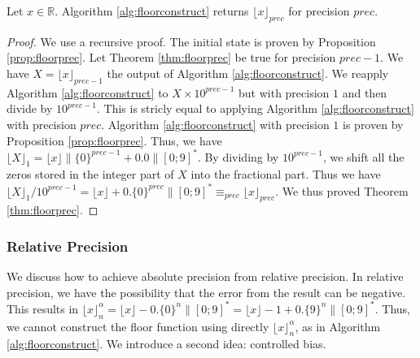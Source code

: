 \documentclass[runningheads]{llncs}
\begin{document}
\begin{theorem}\label{thm:floorprec}
  Let $x\in\mathbb{R}$. Algorithm \ref{alg:floorconstruct} returns $\lfloor x \rfloor_{prec}$ for precision $prec$.
\end{theorem}
\begin{proof}
  We use a recursive proof. The initial state is proven by Proposition \ref{prop:floorprec}. Let Theorem \ref{thm:floorprec} be true for precision $prec-1$. We have $X=\lfloor x \rfloor_{prec-1}$ the output of Algorithm \ref{alg:floorconstruct}. We reapply Algorithm \ref{alg:floorconstruct} to $X\times 10^{prec-1}$ but with precision $1$ and then divide by $10^{prec-1}$. This is stricly equal to applying Algorithm \ref{alg:floorconstruct} with precision $prec$. Algorithm \ref{alg:floorconstruct} with precision $1$ is proven by Proposition \ref{prop:floorprec}. Thus, we have $\lfloor X \rfloor_1 = \lfloor x\rfloor \| \{0\}^{prec-1} + 0.0\|[0;9]^*$. By dividing by $10^{prec-1}$, we shift all the zeros stored in the integer part of $X$ into the fractional part. Thus we have $\lfloor X \rfloor_1 /10^{prec-1} = \lfloor x \rfloor + 0.\{0\}^{prec}\|[0;9]^* \equiv_{prec} \lfloor x \rfloor_{prec}$. We thus proved Theorem \ref{thm:floorprec}.
\end{proof}

\subsubsection{Relative Precision}
We discuss how to achieve absolute precision from relative precision. In relative precision, we have the possibility that the error from the result can be negative. This results in $\lfloor x \rfloor_n^\alpha = \lfloor x \rfloor - 0.\{0\}^{n}\|[0;9]^*=\lfloor x \rfloor-1 + 0.\{9\}^{n}\|[0;9]^* $. Thus, we cannot construct the floor function using directly $\lfloor x \rfloor_n^\alpha$, as in Algorithm \ref{alg:floorconstruct}. We introduce a second idea: controlled bias.

\medskip
\end{document}
